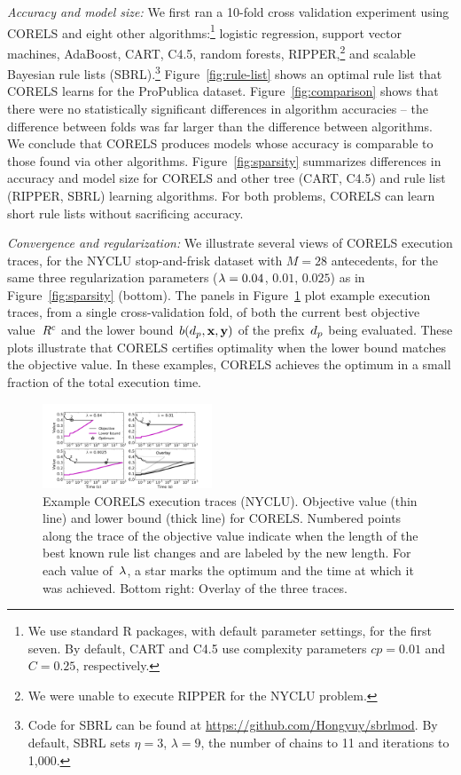 \textit{Accuracy and model size:}
We first ran a 10-fold cross validation experiment using CORELS
and eight other algorithms:\footnote{We use standard R packages, with default
parameter settings, for the first seven.
By default, CART and C4.5 use complexity parameters ${cp = 0.01}$
and ${C = 0.25}$, respectively.}
logistic regression, support vector machines, AdaBoost, CART, C4.5, random forests,
RIPPER,\footnote{We were unable to execute RIPPER for the NYCLU problem.}
and scalable Bayesian rule lists (SBRL).\footnote{Code for SBRL can be found at
\url{https://github.com/Hongyuy/sbrlmod}.
By default, SBRL sets ${\eta = 3}$, ${\lambda = 9}$,
the number of chains to 11 and iterations to 1,000.
}
%
Figure~\ref{fig:rule-list} shows an  optimal rule list that CORELS learns
for the ProPublica dataset.
%
Figure~\ref{fig:comparison} shows that there were no statistically significant
differences in algorithm accuracies --
the difference between folds was far larger than the difference between algorithms.
%
We conclude that CORELS produces models whose accuracy is comparable to those found via other algorithms.
%
Figure~\ref{fig:sparsity} summarizes differences in accuracy and model size
for CORELS and other tree (CART, C4.5) and rule list (RIPPER, SBRL) learning algorithms.
%
For both problems, CORELS can learn short rule lists without sacrificing accuracy.

\textit{Convergence and regularization:}
We illustrate several views of CORELS execution traces,
for the NYCLU stop-and-frisk dataset with ${M = 28}$ antecedents,
for the same three regularization parameters (${{\lambda} = 0.04}$, $0.01$, $0.025$)
as in Figure~\ref{fig:sparsity} (bottom).
%
The panels in Figure~\ref{fig:weapon-reg-execution} plot example execution traces,
from a single cross-validation fold, of both the current best objective value~${R^c}$
and the lower bound~$b(d_p, \mathbf{x}, \mathbf{y})$ of the prefix~$d_p$ being evaluated.
%
These plots illustrate that CORELS certifies optimality
when the lower bound matches the objective value.
%
In these examples, CORELS achieves the optimum in a small fraction of the total execution time.

\begin{figure}[t!]
\begin{center}
\includegraphics[trim={25mm 10mm 35mm 10mm},
width=0.45\textwidth]{figs/weapon_reg_small-execution.pdf}
\end{center}
\caption{Example CORELS execution traces (NYCLU).
%
Objective value (thin line) and lower bound (thick line) for CORELS.
%
Numbered points along the trace of the objective value
indicate when the length of the best known rule list changes
and are labeled by the new length.
%
For each value of~${\lambda}$, a star marks the optimum
and the time at which it was achieved.
%
Bottom right: Overlay of the three traces.
}
\label{fig:weapon-reg-execution}
\end{figure}

